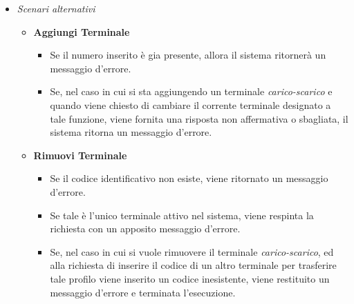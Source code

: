 \documentclass[12pt, letterpaper]{article}
\begin{document}
\begin{itemize}
    \item \emph{Scenari alternativi}
    \begin{itemize}
        \item \textbf{Aggiungi Terminale}
        \begin{itemize}
            \item Se il numero inserito è gia presente, allora il sistema ritornerà un messaggio d'errore.
            \item Se, nel caso in cui si sta aggiungendo un terminale \emph{carico-scarico} e quando viene chiesto di cambiare il corrente terminale designato a tale funzione, viene fornita una risposta non affermativa o sbagliata, il sistema ritorna un messaggio d'errore.
        \end{itemize}
    \end{itemize}

    \begin{itemize}
        \item \textbf{Rimuovi Terminale}
        \begin{itemize}
            \item Se il codice identificativo non esiste, viene ritornato un messaggio d'errore.
            \item Se tale è l'unico terminale attivo nel sistema, viene respinta la richiesta con un apposito messaggio d'errore.
            \item Se, nel caso in cui si vuole rimuovere il terminale \emph{carico-scarico}, ed alla richiesta di inserire il codice di un altro terminale per trasferire tale profilo viene inserito un codice inesistente, viene restituito un messaggio d'errore e terminata l'esecuzione.
        \end{itemize}
    \end{itemize}


\end{itemize}
\end{document}
